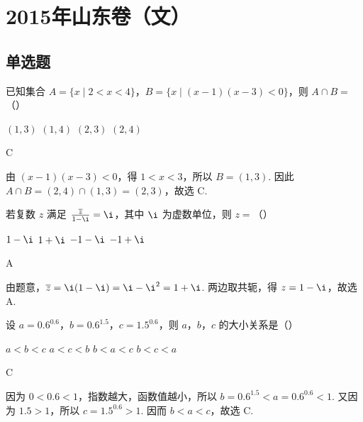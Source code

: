 \chapter{2015年山东卷（文）}

\section{单选题}

\begin{problem}
已知集合 \(A = \{x \mid 2 < x < 4\}\)，\(B = \{x \mid (x - 1)(x - 3) < 0\}\)，则 \(A \cap B =\)（\quad）

\choices
    {\((1,3)\)}
    {\((1, 4)\)}
    {\((2,3)\)}
    {\((2,4)\)}
\end{problem}

\begin{answer}
C
\end{answer}

\begin{solution}
由 \((x-1)(x-3)<0\)，得 \(1<x<3\)，所以 \(B=(1,3)\). 因此
\(A\cap B=(2,4)\cap(1,3)=(2,3)\)，故选 C.
\end{solution}

\begin{problem}
若复数 \(z\) 满足 \(\frac{\overline{z}}{1 - \i} = \i\)，其中 \(\i\) 为虚数单位，则 \(z =\)（\quad）

\choices
    {\(1 - \i\)}
    {\(1 + \i\)}
    {\(-1 - \i\)}
    {\(-1 + \i\)}
\end{problem}

\begin{answer}
A
\end{answer}

\begin{solution}
由题意，\(\overline{z}=\i(1-\i)=\i-\i^2=1+\i\). 两边取共轭，得 \(z=1-\i\)，故选 A.
\end{solution}

\begin{problem}
设 \(a = 0.6^{0.6}\)，\(b = 0.6^{1.5}\)，\(c = 1.5^{0.6}\)，则 \(a\)，\(b\)，\(c\) 的大小关系是（\quad）

\choices
    {\(a < b < c\)}
    {\(a < c < b\)}
    {\(b < a < c\)}
    {\(b < c < a\)}
\end{problem}

\begin{answer}
C
\end{answer}

\begin{solution}
因为 \(0<0.6<1\)，指数越大，函数值越小，所以
\(b=0.6^{1.5}<a=0.6^{0.6}<1\). 又因为 \(1.5>1\)，所以 \(c=1.5^{0.6}>1\). 因而 \(b<a<c\)，故选 C.
\end{solution}

